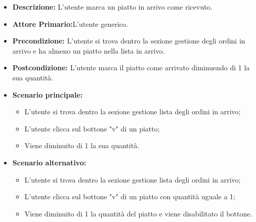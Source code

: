 \begin{itemize}
    \item \textbf{Descrizione:} L'utente marca un piatto in arrivo come ricevuto.
    \item \textbf{Attore Primario:}L'utente generico.
    \item \textbf{Precondizione:} L'utente si trova dentro la sezione gestione degli ordini in arrivo e ha almeno un piatto nella lista in arrivo.
    \item \textbf{Postcondizione:} L'utente marca il piatto come arrivato diminuendo di 1 la sua quantità.
    \item \textbf{Scenario principale:}
    \begin{itemize}
        \item L'utente si trova dentro la sezione gestione lista degli ordini in arrivo;
        \item L'utente clicca sul bottone "v" di un piatto;
        \item Viene diminuito di 1 la sua quantità.
    \end{itemize}
    \item \textbf{Scenario alternativo:}
    \begin{itemize}
        \item L'utente si trova dentro la sezione gestione lista degli ordini in arrivo;
        \item L'utente clicca sul bottone "v" di un piatto con quantità uguale a 1;
        \item Viene diminuito di 1 la quantità del piatto e viene disabilitato il bottone.
    \end{itemize}
\end{itemize}

